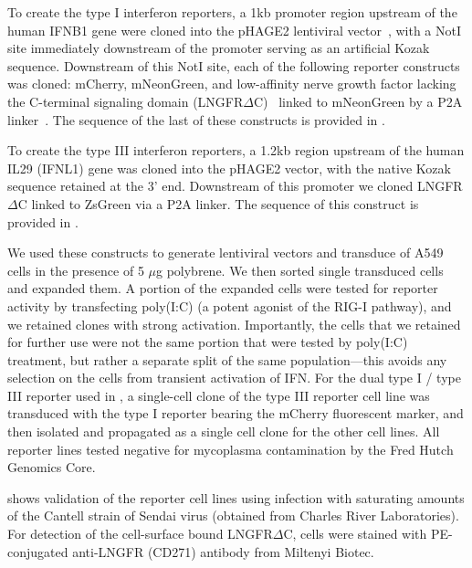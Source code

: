 \documentclass[9pt,lineno]{elife}
\begin{document}
To create the type I interferon reporters, a 1kb promoter region upstream of the human IFNB1 gene were cloned into the pHAGE2 lentiviral vector~\citep{oconnell2010lentiviral}, with a NotI site immediately downstream of the promoter serving as an artificial Kozak sequence. 
Downstream of this NotI site, each of the following reporter constructs was cloned: mCherry, mNeonGreen, and low-affinity nerve growth factor lacking the C-terminal signaling domain (LNGFR$\Delta$C)~\citep{bonini1997hsv,ruggieri1997cell} linked to mNeonGreen by a P2A linker~\citep{kim2011high}.
The sequence of the last of these constructs is provided in .

To create the type III interferon reporters, a 1.2kb region upstream of the human IL29 (IFNL1) gene was cloned into the pHAGE2 vector, with the native Kozak sequence retained at the 3' end. 
Downstream of this promoter we cloned LNGFR$\Delta$C linked to ZsGreen via a P2A linker.
The sequence of this construct is provided in .
 
We used these constructs to generate lentiviral vectors and transduce of A549 cells in the presence of 5 $\mu$g polybrene.
We then sorted single transduced cells and expanded them.
A portion of the expanded cells were tested for reporter activity by transfecting poly(I:C) (a potent agonist of the RIG-I pathway), and we retained clones with strong activation.
Importantly, the cells that we retained for further use were not the same portion that were tested by poly(I:C) treatment, but rather a separate split of the same population---this avoids any selection on the cells from transient activation of IFN.
For the dual type I / type III reporter used in , a single-cell clone of the type III reporter cell line was transduced with the type I reporter bearing the mCherry fluorescent marker, and then isolated and propagated as a single cell clone for the other cell lines.
All reporter lines tested negative for mycoplasma contamination by the Fred Hutch Genomics Core.

 shows validation of the reporter cell lines using infection with saturating amounts of the Cantell strain of Sendai virus (obtained from Charles River Laboratories).
For detection of the cell-surface bound LNGFR$\Delta$C, cells were stained with PE-conjugated anti-LNGFR (CD271) antibody from Miltenyi Biotec.
\end{document}
